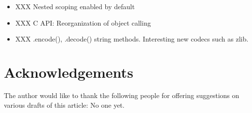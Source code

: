 \documentclass{howto}
\begin{document}
\begin{itemize}

  \item XXX Nested scoping enabled by default

  \item XXX C API: Reorganization of object calling 

  \item XXX .encode(), .decode() string methods.  Interesting new codecs such
as zlib.

 
 
 

\end{itemize}



\section{Acknowledgements}

The author would like to thank the following people for offering
suggestions on various drafts of this article: No one yet.
\end{document}
